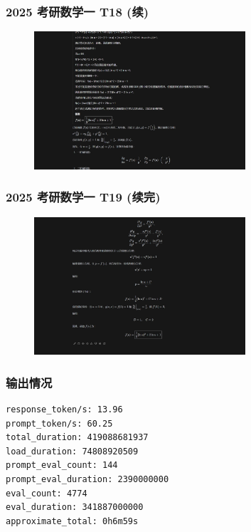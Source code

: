 \begin{frame}
\frametitle{2025 考研数学一 T18 (续)}
\begin{figure}
    \centering
    \includegraphics[width=0.7\textwidth]{./pic/15.png} %
    \label{fig:kaoyan_solution_7}
\end{figure}
\end{frame}


\begin{frame}
    \frametitle{2025 考研数学一 T19 (续完)}
    \begin{figure}
        \centering
        \includegraphics[width=0.7\textwidth]{./pic/16.png} %
        \label{fig:kaoyan_solution_7}
    \end{figure}
    \end{frame}

\begin{frame}[fragile]
\frametitle{输出情况}
\begin{lstlisting}[caption={2025 考研数学一 T18生成情况}]
response_token/s: 13.96
prompt_token/s: 60.25
total_duration: 419088681937
load_duration: 74808920509
prompt_eval_count: 144
prompt_eval_duration: 2390000000
eval_count: 4774
eval_duration: 341887000000
approximate_total: 0h6m59s
\end{lstlisting}
\end{frame}